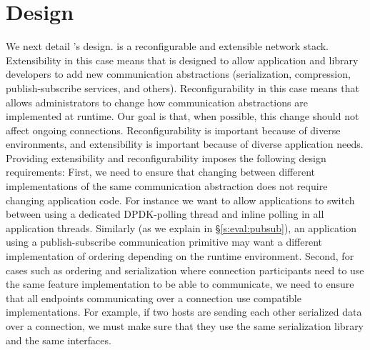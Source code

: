 \section{\name Design}\label{sec:design}\label{s:design}
\begin{outline}
    \1 We next detail \name's design. \name is a reconfigurable and extensible network stack.
        \2 Extensibility in this case means that \name is designed to allow application and library developers to add new communication abstractions (\eg serialization, compression, publish-subscribe services, and others).
        \2 Reconfigurability in this case means that \name allows administrators to change how communication abstractions are implemented at runtime. Our goal is that, when possible, this change should not affect ongoing connections.
      \2 Reconfigurability is important because of diverse environments, and extensibility is important because of diverse application needs.
    \1 Providing extensibility and reconfigurability imposes the following design requirements: 
      \2 First, we need to ensure that changing between different implementations of the same communication abstraction does not require changing application code. 
        \3 For instance we want to allow applications to switch between using a dedicated  DPDK-polling thread and inline polling in all application threads.
        \3 
         Similarly (as we explain in \S\ref{s:eval:pubsub}), an application using a publish-subscribe communication primitive may want a different implementation of ordering depending on the runtime environment. 
      \2 Second, for cases such as ordering and serialization where connection participants need to use the same feature implementation to be able to communicate, we need to ensure that all endpoints communicating over a connection use compatible implementations.   \3 For example, if two hosts are sending each other serialized data over a connection, we must make sure that they use the same serialization library and the same interfaces.

\end{outline}

